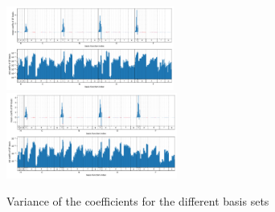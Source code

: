 \begin{figure}
        \includegraphics[width=0.49\textwidth]{chapters/results/results_images/var_coeffsfitted_regularized_basis_3.0}
        \includegraphics[width=0.5\textwidth]{chapters/results/results_images/var_coeffsfitted_regularized_basis_2.5}
    \caption{Variance of the coefficients for the different basis sets}
\end{figure}